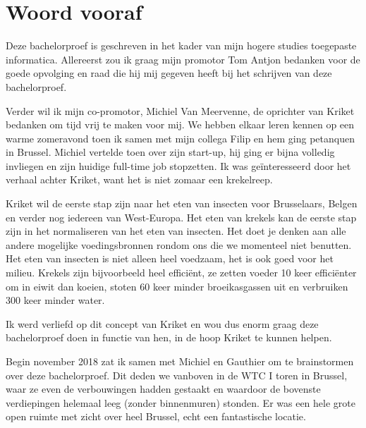 
\chapter*{Woord vooraf}
\label{ch:voorwoord}


Deze bachelorproef is geschreven in het kader van mijn hogere studies toegepaste informatica. Allereerst zou ik graag mijn promotor Tom Antjon bedanken voor de goede opvolging en raad die hij mij gegeven heeft bij het schrijven van deze bachelorproef. 

Verder wil ik mijn co-promotor, Michiel Van Meervenne, de oprichter van Kriket bedanken om tijd vrij te maken voor mij. We hebben elkaar leren kennen op een warme zomeravond toen ik samen met mijn collega Filip en hem ging petanquen in Brussel. Michiel vertelde toen over zijn start-up, hij ging er bijna volledig invliegen en zijn huidige full-time job stopzetten. Ik was geïnteresseerd door het verhaal achter Kriket, want het is niet zomaar een krekelreep. 

Kriket wil de eerste stap zijn naar het eten van insecten voor Brusselaars, Belgen en verder nog iedereen van West-Europa. Het eten van krekels kan de eerste stap zijn in het normaliseren van het eten van insecten. Het doet je denken aan alle andere mogelijke voedingsbronnen rondom ons die we momenteel niet benutten. Het eten van insecten is niet alleen heel voedzaam, het is ook goed voor het milieu. Krekels zijn bijvoorbeeld heel efficiënt, ze zetten voeder 10 keer efficiënter om in eiwit dan koeien, stoten 60 keer minder broeikasgassen uit en verbruiken 300 keer minder water. \autocite{Kriket2018}

Ik werd verliefd op dit concept van Kriket en wou dus enorm graag deze bachelorproef doen in functie van hen, in de hoop Kriket te kunnen helpen. 

Begin november 2018 zat ik samen met Michiel en Gauthier om te brainstormen over deze bachelorproef. Dit deden we vanboven in de WTC I toren in Brussel, waar ze even de verbouwingen hadden gestaakt en waardoor de bovenste verdiepingen helemaal leeg (zonder binnenmuren) stonden. Er was een hele grote open ruimte met zicht over heel Brussel, echt een fantastische locatie.

